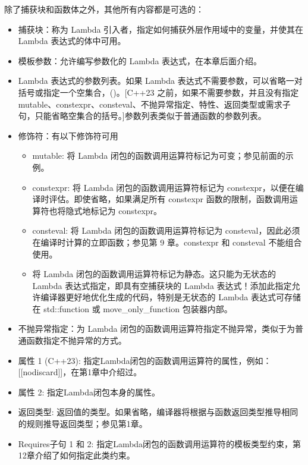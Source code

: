 除了捕获块和函数体之外，其他所有内容都是可选的：

\begin{itemize}
\item
捕获块：称为 Lambda 引入者，指定如何捕获外层作用域中的变量，并使其在 Lambda 表达式的体中可用。

\item
模板参数：允许编写参数化的 Lambda 表达式，在本章后面介绍。

\item
Lambda 表达式的参数列表。如果 Lambda 表达式不需要参数，可以省略一对括号或指定一个空集合，()。[C++23 之前，如果不需要参数，并且没有指定 mutable、constexpr、consteval、不抛异常指定、特性、返回类型或需求子句，只能省略空集合的括号。]参数列表类似于普通函数的参数列表。

\item
修饰符：有以下修饰符可用
\begin{itemize}
\item
mutable: 将 Lambda 闭包的函数调用运算符标记为可变；参见前面的示例。

\item
constexpr: 将 Lambda 闭包的函数调用运算符标记为 constexpr，以便在编译时评估。即使省略，如果满足所有 constexpr 函数的限制，函数调用运算符也将隐式地标记为 constexpr。

\item
consteval: 将 Lambda 闭包的函数调用运算符标记为 consteval，因此必须在编译时计算的立即函数；参见第 9 章。constexpr 和 consteval 不能组合使用。

\item
将 Lambda 闭包的函数调用运算符标记为静态。这只能为无状态的 Lambda 表达式指定，即具有空捕获块的 Lambda 表达式！添加此指定允许编译器更好地优化生成的代码，特别是无状态的 Lambda 表达式可存储在 std::function 或 move\_only\_function 包装器内部。

\end{itemize}

\item
不抛异常指定：为 Lambda 闭包的函数调用运算符指定不抛异常，类似于为普通函数指定不抛异常的方式。


\item
属性 1 (C++23): 指定Lambda闭包的函数调用运算符的属性，例如：[[nodiscard]]，在第1章中介绍过。

\item
属性 2: 指定Lambda闭包本身的属性。

\item
返回类型: 返回值的类型。如果省略，编译器将根据与函数返回类型推导相同的规则推导返回类型；参见第1章。

\item
Requires子句 1 和 2: 指定Lambda闭包的函数调用运算符的模板类型约束，第12章介绍了如何指定此类约束。
\end{itemize}

